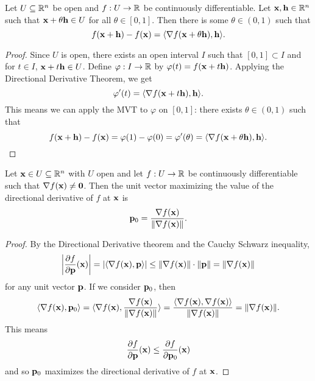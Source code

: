 \documentclass[letterpaper, twoside, 12pt]{book}
\begin{document}
\begin{theorem}
  Let \(U\subseteq\mathbb R^n\) be open and \(f:U\to\mathbb R\) be continuously
  differentiable. Let \(\mathbf x,\mathbf h\in \mathbb R^n\)
  such that \(\mathbf x+\theta \mathbf h\in U\) for all
  \(\theta\in[0,1]\). Then there is some \(\theta\in(0,1)\) such that
  \[
    f(\mathbf x+\mathbf h)
      -
    f(\mathbf x)
      =
    \langle\nabla f(\mathbf x+\theta\mathbf h), \mathbf h\rangle
  .\]
\end{theorem}

\begin{proof}
    Since \(U\) is open, there exists an open interval \(I\) such that
    \([0, 1] \subset I\) and for \(t \in I\), \(\mathbf x + t \mathbf h \in U\).
    Define \(\varphi: I \to \mathbb R\) by \(\varphi(t) = f(\mathbf x + t \mathbf h)\).
    Applying the Directional Derivative Theorem, we get
    \[ \varphi'(t) = \langle \nabla f(\mathbf x + t \mathbf h), \mathbf h\rangle .\]
    This means we can apply the MVT to \(\varphi\) on \([0,1]\):
    there exists \(\theta \in (0,1)\) such that
    \[ f(\mathbf x + \mathbf h) - f(\mathbf x) = 
        \varphi(1) - \varphi(0) = 
        \varphi'(\theta) =
    \langle \nabla f(\mathbf x + \theta \mathbf h), \mathbf h\rangle .\]
\end{proof}

\begin{corollary}[13.18]
  Let \(\mathbf x\in U\subseteq\mathbb R^n\) with \(U\) open and let \(f:U\to\mathbb R\)
  be continuously differentiable such that
  \(\nabla f(\mathbf x)\not=\mathbf 0\). Then the unit vector maximizing
  the value of the directional derivative of \(f\) at \(\mathbf x\) is
  \[
    \mathbf p_0
      =
    \frac{\nabla f(\mathbf x)}{\|\nabla f(\mathbf x)\|}
  .\]
\end{corollary}

\begin{proof}
    By the Directional Derivative theorem and the Cauchy Schwarz inequality,
    \[ \bigg|\frac{\partial f}{\partial \mathbf p}(\mathbf x)\bigg| = 
        |\langle\nabla f(\mathbf x), \mathbf p\rangle| \leq \|\nabla f(\mathbf x)\| \cdot \|\mathbf p\| =
    \|\nabla f(\mathbf x)\| \]
    for any unit vector \(\mathbf p\). If we consider \(\mathbf p_0\), then
    \[ \langle\nabla f(\mathbf x), \mathbf p_0\rangle = \langle \nabla f(\mathbf x), \frac{\nabla f(\mathbf x)}{\|\nabla f(\mathbf x)\|}\rangle
    = \frac{\langle \nabla f(\mathbf x), \nabla f(\mathbf x)\rangle}{\|\nabla f(\mathbf x)\|} = \|\nabla f(\mathbf x)\|.\]
    This means 
    \[ \frac{\partial f}{\partial \mathbf p}(\mathbf x) \leq \frac{\partial f}{\partial \mathbf p_0}(\mathbf x) \]
    and so \(\mathbf p_0\) maximizes the directional derivative of \(f\) at \(\mathbf x\).
\end{proof}
\end{document}
